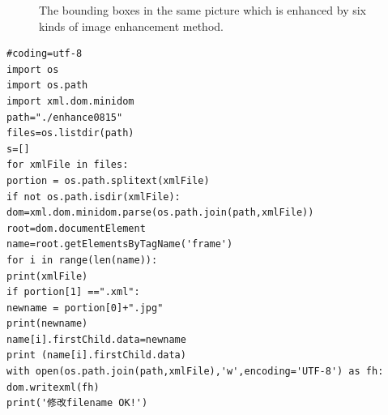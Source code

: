 \documentclass[a4paper]{article}
\begin{document}
\begin{figure}
{	} 
	\caption{The bounding boxes in the same picture which is enhanced by six kinds of image enhancement method.} 
	\label{p2} %
\end{figure}

\lstset{language=python}
\begin{lstlisting}
#coding=utf-8
import os
import os.path
import xml.dom.minidom
path="./enhance0815"
files=os.listdir(path)
s=[]
for xmlFile in files:
portion = os.path.splitext(xmlFile)
if not os.path.isdir(xmlFile):
dom=xml.dom.minidom.parse(os.path.join(path,xmlFile))
root=dom.documentElement
name=root.getElementsByTagName('frame')
for i in range(len(name)):
print(xmlFile)
if portion[1] ==".xml":           
newname = portion[0]+".jpg"
print(newname)
name[i].firstChild.data=newname
print (name[i].firstChild.data)
with open(os.path.join(path,xmlFile),'w',encoding='UTF-8') as fh:
dom.writexml(fh)
print('修改filename OK!')
\end{lstlisting}\label{g1}
\end{document}
